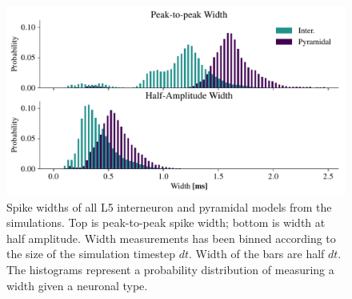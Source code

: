\documentclass[altfont, fleqn]{uiophd}
\begin{document}
\begin{figure}[h]
    \begin{center}
        \includegraphics[width=\textwidth]{images/sec_4/int_pyr_width_I_II.pdf}
        \caption{
            Spike widths of all L5 interneuron and pyramidal models from
            the simulations. 
            Top is peak-to-peak spike width; bottom is 
            width at half amplitude.
            Width measurements has been binned according to 
            the size of the simulation timestep 
            $dt$.
            Width of the bars are half $dt$.
            The histograms represent a probability distribution of measuring a width
            given a neuronal type. 
        }
        \label{fig:4_width_I_II_histograms}
    \end{center}
\end{figure}
\end{document}

